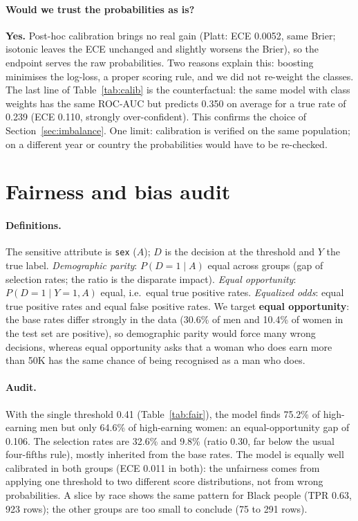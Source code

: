 \documentclass[11pt,a4paper]{article}
\newcommand{\code}[1]{\texttt{#1}}
\begin{document}
\paragraph{Would we trust the probabilities as is?} \textbf{Yes.} Post-hoc calibration brings no
real gain (Platt: ECE 0.0052, same Brier; isotonic leaves the ECE unchanged and slightly worsens the Brier), so the endpoint serves the raw
probabilities. Two reasons explain this: boosting minimises the log-loss, a proper scoring rule, and
we did not re-weight the classes. The last line of Table~\ref{tab:calib} is the counterfactual: the
same model with class weights has the same ROC-AUC but predicts 0.350 on average for a true rate of
0.239 (ECE 0.110, strongly over-confident). This confirms the choice of Section~\ref{sec:imbalance}.
One limit: calibration is verified on the same population; on a different year or country the
probabilities would have to be re-checked.

\section{Fairness and bias audit}\label{sec:fair}

\paragraph{Definitions.} The sensitive attribute is \code{sex} ($A$); $D$ is the decision at the
threshold and $Y$ the true label. \emph{Demographic parity}: $P(D{=}1\mid A)$ equal across groups
(gap of selection rates; the ratio is the disparate impact). \emph{Equal opportunity}:
$P(D{=}1\mid Y{=}1,A)$ equal, i.e.\ equal true positive rates. \emph{Equalized odds}: equal true
positive rates and equal false positive rates. We target \textbf{equal opportunity}: the base rates
differ strongly in the data (30.6\% of men and 10.4\% of women in the test set are positive), so
demographic parity would force many wrong decisions, whereas equal opportunity asks that a woman who
does earn more than 50K has the same chance of being recognised as a man who does.

\paragraph{Audit.} With the single threshold 0.41 (Table~\ref{tab:fair}), the model finds 75.2\% of
high-earning men but only 64.6\% of high-earning women: an equal-opportunity gap of 0.106. The
selection rates are 32.6\% and 9.8\% (ratio 0.30, far below the usual four-fifths rule), mostly
inherited from the base rates. The model is equally well calibrated in both groups (ECE 0.011 in
both): the unfairness comes from applying one threshold to two different score distributions, not
from wrong probabilities. A slice by race shows the same pattern for Black people (TPR 0.63, 923
rows); the other groups are too small to conclude (75 to 291 rows).
\end{document}
